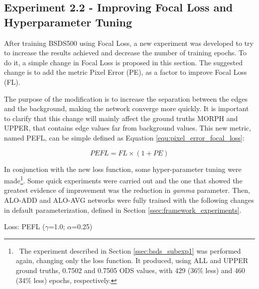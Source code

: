 \subsection{Experiment 2.2 - Improving Focal Loss and Hyperparameter Tuning}
\label{ssec:bsds_subexp2}

After training BSDS500 using Focal Loss, a new experiment was developed to try to increase the results achieved and decrease the number of training epochs.
To do it, a simple change in Focal Loss is proposed in this section.
The suggested change is to add the metric Pixel Error (PE), as a factor to improve Focal Loss (FL).

The purpose of the modification is to increase the separation between the edges and the background, making the network converge more quickly.
It is important to clarify that this change will mainly affect the ground truths MORPH and UPPER, that contains edge values far from background values.
This new metric, named PEFL, can be simple defined as Equation \ref{equ:pixel_error_focal_loss}:

\begin{equation}
  PEFL = FL \times (1 + PE)
  \label{equ:pixel_error_focal_loss}
\end{equation}

In conjunction with the new loss function, some hyper-parameter tuning were made\footnote{~The experiment described in Section \ref{ssec:bsds_subexp1} was performed again, changing only the loss function. It produced, using ALL and UPPER ground truths, 0.7502 and 0.7505 ODS values, with 429 (36\% less) and 460 (34\% less) epochs, respectively.}.
Some quick experiments were carried out and the one that showed the greatest evidence of improvement was the reduction in \textit{gamma} parameter.
Then, ALO-ADD and ALO-AVG networks were fully trained with the following changes in default parameterization, defined in Section \ref{ssec:framework_experiments}.

\begin{center}
Loss: PEFL ($\gamma$=1.0; $\alpha$=0.25)
\end{center}

% 

